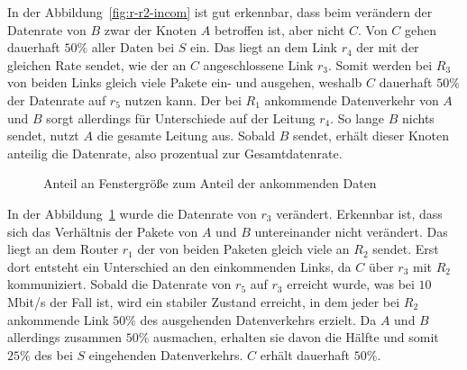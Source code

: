 \documentclass [10pt,a4paper]{article}
\begin{document}
		In der Abbildung~\ref{fig:r-r2-incom} ist gut erkennbar, dass beim verändern der Datenrate von $B$ zwar der Knoten $A$ betroffen ist, aber nicht $C$. Von $C$ gehen dauerhaft $50\%$ aller Daten bei $S$ ein. Das liegt an dem Link $r_4$ der mit der gleichen Rate sendet, wie der an $C$ angeschlossene Link $r_3$. Somit werden bei $R_3$ von beiden Links gleich viele Pakete ein- und ausgehen, weshalb $C$ dauerhaft $50\%$ der Datenrate auf $r_5$ nutzen kann. Der bei $R_1$ ankommende Datenverkehr von $A$ und $B$ sorgt allerdings für Unterschiede auf der Leitung $r_4$. So lange $B$ nichts sendet, nutzt $A$ die gesamte Leitung aus. Sobald $B$ sendet, erhält dieser Knoten anteilig die Datenrate, also prozentual zur Gesamtdatenrate.
		
		\begin{figure}[[htb]
			\caption[Anteil an Fenstergröße zum Anteil der ankommenden Daten]{Anteil an Fenstergröße zum Anteil der ankommenden Daten}
			\label{fig:r-r3-incom}
		\end{figure}
		
		In der Abbildung~\ref{fig:r-r3-incom} wurde die Datenrate von $r_3$ verändert. Erkennbar ist, dass sich das Verhältnis der Pakete von $A$ und $B$ untereinander nicht verändert. Das liegt an dem Router $r_1$ der von beiden Paketen gleich viele an $R_2$ sendet. Erst dort entsteht ein Unterschied an den einkommenden Links, da $C$ über $r_3$ mit $R_2$ kommuniziert. Sobald die Datenrate von $r_5$ auf $r_3$ erreicht wurde, was bei $10$ Mbit/s der Fall ist, wird ein stabiler Zustand erreicht, in dem jeder bei $R_2$ ankommende Link $50\%$ des ausgehenden Datenverkehrs erzielt. Da $A$ und $B$ allerdings zusammen $50\%$ ausmachen, erhalten sie davon die Hälfte und somit $25\%$ des bei $S$ eingehenden Datenverkehrs. $C$ erhält dauerhaft $50\%$.
		
\end{document}
